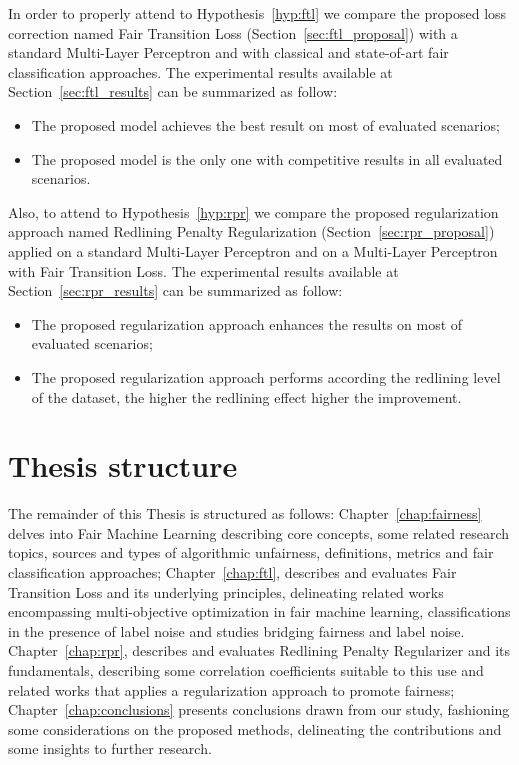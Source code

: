 In order to properly attend to Hypothesis~\ref{hyp:ftl} we compare the proposed loss correction named Fair Transition Loss (Section~\ref{sec:ftl_proposal}) with a standard Multi-Layer Perceptron and with classical and state-of-art fair classification approaches. The experimental results available at Section~\ref{sec:ftl_results} can be summarized as follow:
\begin{itemize}
    \item The proposed model achieves the best result on most of evaluated scenarios;
    \item The proposed model is the only one with competitive results in all evaluated scenarios.
\end{itemize}

Also, to attend to Hypothesis~\ref{hyp:rpr} we compare the proposed regularization approach named Redlining Penalty Regularization (Section~\ref{sec:rpr_proposal}) applied on a standard Multi-Layer Perceptron and on a Multi-Layer Perceptron with Fair Transition Loss. The experimental results available at Section~\ref{sec:rpr_results} can be summarized as follow:
\begin{itemize}
    \item The proposed regularization approach enhances the results on most of evaluated scenarios;
    \item The proposed regularization approach performs according the redlining level of the dataset, the higher the redlining effect higher the improvement.
\end{itemize}

\section{Thesis structure}

The remainder of this Thesis is structured as follows: Chapter~\ref{chap:fairness} delves into Fair Machine Learning describing core concepts, some related research topics, sources and types of algorithmic unfairness, definitions, metrics and fair classification approaches; Chapter~\ref{chap:ftl}, describes and evaluates Fair Transition Loss and its underlying principles, delineating related works encompassing multi-objective optimization in fair machine learning, classifications in the presence of label noise and studies bridging fairness and label noise. Chapter~\ref{chap:rpr}, describes and evaluates Redlining Penalty Regularizer and its fundamentals, describing some correlation coefficients suitable to this use and related works that applies a regularization approach to promote fairness; Chapter~\ref{chap:conclusions} presents conclusions drawn from our study, fashioning some considerations on the proposed methods, delineating the contributions and some insights to further research.